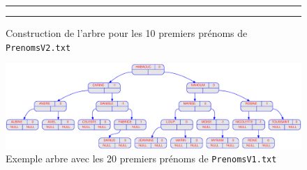 \documentclass{article} %
\begin{document}
\begin{figure}[p]
\begin{center}
     \rule{\linewidth}{.5pt} %
     \vline
      \rule{\linewidth}{.5pt} %
   
    
  \end{center}
  
  \caption{Construction de l'arbre pour les 10 premiers prénoms de \texttt{PrenomsV2.txt}}
  \label{fig:prog1_1}
\end{figure}

\begin{figure}[p]
  \begin{center}
    \includegraphics[scale=0.36]{Img_prog1/displayAVL_20.eps}
  \end{center}
  \caption{Exemple arbre avec les 20 premiers prénoms de \texttt{PrenomsV1.txt}}
\end{figure}
\end{document}
